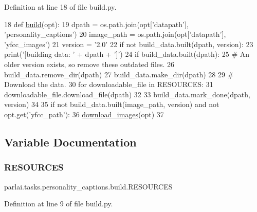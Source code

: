 Definition at line 18 of file build.\+py.


\begin{DoxyCode}
18 \textcolor{keyword}{def }\hyperlink{namespacedialog__babi__feedback_1_1build_a7a9d289f7493a5ded13c4b7f071b6184}{build}(opt):
19     dpath = os.path.join(opt[\textcolor{stringliteral}{'datapath'}], \textcolor{stringliteral}{'personality\_captions'})
20     image\_path = os.path.join(opt[\textcolor{stringliteral}{'datapath'}], \textcolor{stringliteral}{'yfcc\_images'})
21     version = \textcolor{stringliteral}{'2.0'}
22     \textcolor{keywordflow}{if} \textcolor{keywordflow}{not} build\_data.built(dpath, version):
23         print(\textcolor{stringliteral}{'[building data: '} + dpath + \textcolor{stringliteral}{']'})
24         \textcolor{keywordflow}{if} build\_data.built(dpath):
25             \textcolor{comment}{# An older version exists, so remove these outdated files.}
26             build\_data.remove\_dir(dpath)
27         build\_data.make\_dir(dpath)
28 
29         \textcolor{comment}{# Download the data.}
30         \textcolor{keywordflow}{for} downloadable\_file \textcolor{keywordflow}{in} RESOURCES:
31             downloadable\_file.download\_file(dpath)
32 
33         build\_data.mark\_done(dpath, version)
34 
35     \textcolor{keywordflow}{if} \textcolor{keywordflow}{not} build\_data.built(image\_path, version) \textcolor{keywordflow}{and} \textcolor{keywordflow}{not} opt.get(\textcolor{stringliteral}{'yfcc\_path'}):
36         \hyperlink{namespaceparlai_1_1tasks_1_1personality__captions_1_1download__images_a9d812a095ca6d48541b3d5cdc65a4bf3}{download\_images}(opt)
37 \end{DoxyCode}


\subsection{Variable Documentation}
\mbox{\label{namespaceparlai_1_1tasks_1_1personality__captions_1_1build_a01ca1cbf21a409d302ebcc1df913dcbb}} 
\subsubsection{\texorpdfstring{R\+E\+S\+O\+U\+R\+C\+ES}{RESOURCES}}
{\footnotesize\ttfamily parlai.\+tasks.\+personality\+\_\+captions.\+build.\+R\+E\+S\+O\+U\+R\+C\+ES}



Definition at line 9 of file build.\+py.

